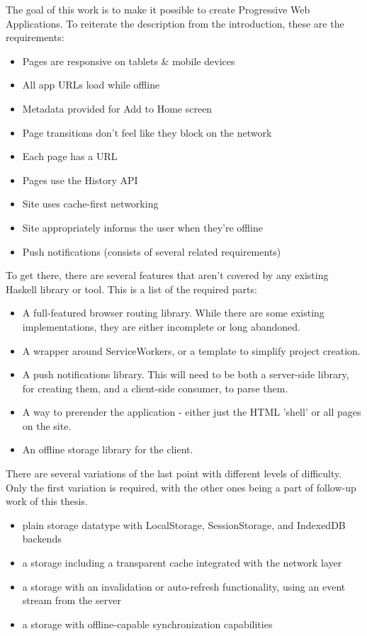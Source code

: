 \documentclass[english,odsaz]{fitthesis}
\begin{document}
The goal of this work is to make it possible to create Progressive Web
Applications. To reiterate the description from the introduction, these are the
requirements:
\begin{itemize}
\item Pages are responsive on tablets \& mobile devices
\item All app URLs load while offline
\item Metadata provided for Add to Home screen
\item Page transitions don't feel like they block on the network
\item Each page has a URL
\item Pages use the History API
\item Site uses cache-first networking
\item Site appropriately informs the user when they're offline
\item Push notifications (consists of several related requirements)
\end{itemize}

To get there, there are several features that aren't covered by any existing
Haskell library or tool. This is a list of the required parts:
\begin{itemize}
\item A full-featured browser routing library. While there are some existing
implementations, they are either incomplete or long abandoned.
\item A wrapper around ServiceWorkers, or a template to simplify project creation.
\item A push notifications library. This will need to be both a server-side library,
for creating them, and a client-side consumer, to parse them.
\item A way to prerender the application - either just the HTML 'shell' or all pages on the site.
\item An offline storage library for the client.
\end{itemize}

There are several variations of the last point with different levels of
difficulty. Only the first variation is required, with the other ones being a
part of follow-up work of this thesis.
\begin{itemize}
\item plain storage datatype with LocalStorage, SessionStorage, and IndexedDB backends
\item a storage including a transparent cache integrated with the network layer
\item a storage with an invalidation or auto-refresh functionality, using an event
stream from the server
\item a storage with offline-capable synchronization capabilities
\end{itemize}
\end{document}
